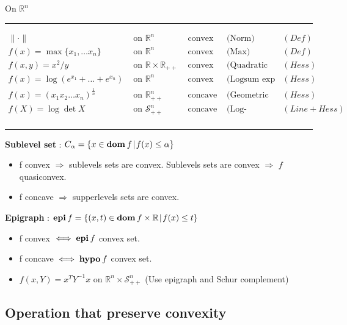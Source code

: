 \documentclass[a4paper, 10pt]{article}
\newcommand{\rline}{\vspace{0em}\noindent\rule{\textwidth}{1pt}\vspace{0em}}
\newcommand{\norm}[1]{\|#1\|}
\newcommand{\set}[2]{\{ #1 \hspace{.1em} | \hspace{.1em}#2 \}}
\newcommand{\R}{\mathbb{R}}
\newcommand{\Rpp}{\mathbb{R}_{++}}
\newcommand{\Rn}{\mathbb{R}^n}
\newcommand{\Rnpp}{\mathbb{R}_{++}^n}
\newcommand{\Snpp}{\mathcal{S}_{++}^n}
\newcommand{\dom}[1]{\textbf{dom}\hspace{0.2em}#1}
\newcommand{\epi}[1]{\textbf{epi}\hspace{0.2em}#1}
\newcommand{\hypo}[1]{\textbf{hypo}\hspace{0.2em}#1}
\newcommand{\itm}[1]{{\color{itmcolor} \textbf{#1}}}
\begin{document}
On $\Rn$\\
\rline
\begin{equation*}
  \begin{array}{lllll}
    \norm{\cdot}                             & \text{ on } \Rn            & \text{ convex }  & \text{(Norm)}                  & (Def)\\
    f(x) = \max\{x_1, \dots x_n\}            & \text{ on } \Rn            & \text{ convex }  & \text{(Max)}                   & (Def)\\
    f(x, y) = x^2 / y                        & \text{ on } \R \times \Rpp & \text{ convex }  & \text{(Quadratic over linear)} & (Hess)\\
    f(x) = \log(e^{x_1} + \dots + e^{x_n})   & \text{ on } \Rn            & \text{ convex }  & \text{(Logsum exp (soft max))} & (Hess)\\
    f(x) = (x_1 x_2 \dots x_n)^{\frac{1}{n}} & \text{ on } \Rnpp          & \text{ concave } & \text{(Geometric mean)}        & (Hess)\\
    f(X) = \log \det{X}                      & \text{ on } \Snpp          & \text{ concave } & \text{(Log-determinant)}       & (Line + Hess)\\
  \end{array}
\end{equation*}
\rline

\itm{Sublevel set} : $C_{\alpha} = \set{x \in \dom{f}}{f(x) \le \alpha}$
\begin{itemize}
\item f convex $\Rightarrow$ sublevels sets are convex. Sublevels sets are convex $\Rightarrow$ $f$ quasiconvex.
\item f concave $\Rightarrow$ supperlevels sets are convex.
\end{itemize}

\itm{Epigraph} : $\epi{f} = \set{(x, t) \in \dom{f} \times \R}{f(x) \le t}$
\begin{itemize}
\item f convex $\iff \epi{f}$ convex set.
\item f concave $\iff \hypo{f}$ convex set.
\item $f(x, Y) = x^T Y^{-1} x$ on $\Rn \times \Snpp$ (Use epigraph and Schur complement)
\end{itemize}

\subsection{Operation that preserve convexity}
\end{document}
